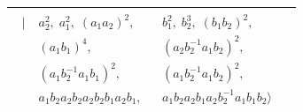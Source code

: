 \documentclass[dvipsnames]{article}
\theoremstyle{definition}
\theoremstyle{remark}
\begin{document}
\begin{longtable}{ |c|c| }
\begin{minipage}{6cm}
{\begin{align*}
            \; \big | \;
            & a_2^2, \;
            a_1^2, \;
            (a_1 a_2)^2,
            && b_1^2, \;
            b_2^3, \;
            (b_1 b_2)^2, \\
            &(a_1 b_1)^4,
            &&(a_2 b_2^{-1} a_1 b_2)^2,\\
            &(a_1 b_2^{-1} a_1 b_1)^2,
            &&(a_1 b_2^{-1} a_1 b_2)^2,\\
            &a_1 b_2 a_2 b_2 a_2 b_2 b_1 a_2 b_1,
            &&a_1 b_2 a_2 b_1 a_2 b_2^{-1} a_1 b_1 b_2
            \big \rangle
        \end{align*}
        \vspace{-5mm}
        }
    \end{minipage}\\
    \hline
    \end{longtable}
\end{document}
